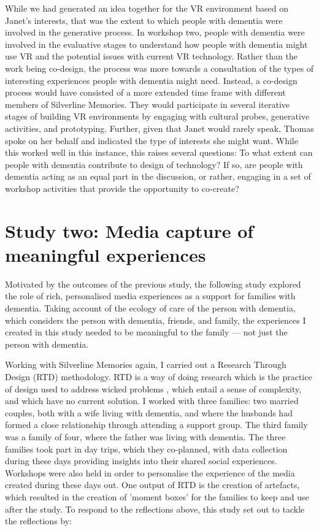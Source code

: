 While we had generated an idea together for the VR environment based on Janet's interests, that was the extent to which people with dementia were involved in the generative process. In workshop two, people with dementia were involved in the evaluative stages to understand how people with dementia might use VR and the potential issues with current VR technology. Rather than the work being co-design, the process was more towards a consultation of the types of interesting experiences people with dementia might need. Instead, a co-design process would have consisted of a more extended time frame with different members of Silverline Memories. They would participate in several iterative stages of building VR environments by engaging with cultural probes, generative activities, and prototyping. Further, given that Janet would rarely speak, Thomas spoke on her behalf and indicated the type of interests she might want. While this worked well in this instance, this raises several questions: To what extent can people with dementia contribute to design of technology? If so, are people with dementia acting as an equal part in the discussion, or rather, engaging in a set of workshop activities that provide the opportunity to co-create? \citep{tsekleves2020engaging,lindsay_empathy_2012}

\section{Study two: Media capture of meaningful experiences}
\label{studyTwo}
Motivated by the outcomes of the previous study, the following study explored the role of rich, personalised media experiences as a support for families with dementia. Taking account of the ecology of care of the person with dementia, which considers the person with dementia, friends, and family, the experiences I created in this study needed to be meaningful to the family — not just the person with dementia. 

Working with Silverline Memories again, I carried out a Research Through Design (RTD) methodology. RTD is a way of doing research which is the practice of design used to address wicked problems \citep{zimmerman_research_2007}, which entail a sense of complexity, and which have no current solution. I worked with three families: two married couples, both with a wife living with dementia, and where the husbands had formed a close relationship through attending a support group. The third family was a family of four, where the father was living with dementia. The three families took part in day trips, which they co-planned, with data collection during these days providing insights into their shared social experiences. Workshops were also held  in order to personalise the experience of the media created during these days out. One output of RTD is the creation of artefacts, which resulted in the creation of 'moment boxes' for the families to keep and use after the study. To respond to the reflections above, this study set out to tackle the reflections by:



